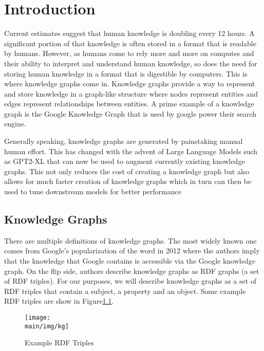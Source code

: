 \documentclass[\main/thesis.tex]{subfiles}
\begin{document}
\chapter{Introduction}

Current estimates suggest that human knowledge is doubling every 12 hours. A significant portion
of that knowledge is often stored in a format that is readable by humans. However, as humans come 
to rely more and more on computes and their ability to interpret and understand human knowledge, so
does the need for storing human knowledge in a format that is digestible by computers. This is where 
knowledge graphs come in. Knowledge graphs provide a way to represent and store knowledge in a 
graph-like structure where nodes represent entities and edges represent relationships between
entities. A prime example of a knowledge graph is the Google Knowledge Graph that is used 
by google power their search engine. 


Generally speaking, knowledge graphs are generated by painstaking manual human effort. 
This has changed with the advent of Large Language Models such as GPT2-XL that can now be used to
augment currently existing knowledge graphs\cite{west_symbolic_2021}. This not only 
reduces the cost of creating a knowledge graph but also allows for much faster creation 
of knowledge graphs which in turn can then be used to tune downstream models for better 
performance\cite{noauthor_kelm_2021}


\section{Knowledge Graphs}\label{sec:knowledgeGraphs}

There are multiple definitions of knowledge graphs. The most widely known one comes from Google's 
popularization of the word in 2012\cite{noauthor_introducing_2012} where the authors imply 
that the knowledge that Google contains is accessible via the Google knowledge graph. On the 
flip side, authors describe knowledge graphs as RDF graphs (a set of RDF triples)\cite{farber_linked_2017}. 
For our purposes, we will describe knowledge graphs as a set of RDF triples that contain 
a subject, a property and an object. Some example RDF triples are show in Figure\ref{fig:kg_fig}.

\begin{figure}
    \centering
    \texttt{[image: \\main/img/kg]}
    \caption[Example RDF Triples] {Example RDF Triples}
    \label{fig:kg_fig}
\end{figure}
\end{document}
